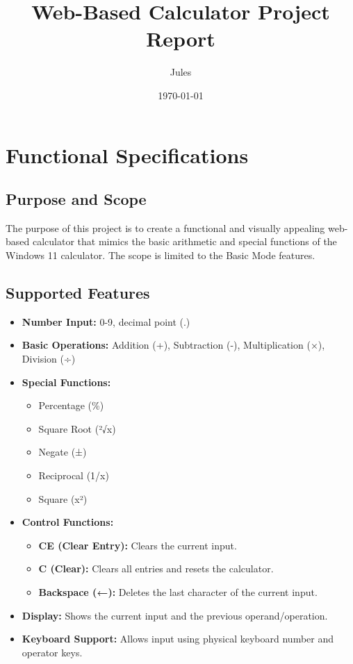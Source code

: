 \documentclass{article}
\title{Web-Based Calculator Project Report}
\author{Jules}
\date{\today}
\begin{document}
\maketitle
\tableofcontents
\newpage

\section{Functional Specifications}

\subsection{Purpose and Scope}
The purpose of this project is to create a functional and visually appealing web-based calculator that mimics the basic arithmetic and special functions of the Windows 11 calculator. The scope is limited to the Basic Mode features.

\subsection{Supported Features}
\begin{itemize}
    \item \textbf{Number Input:} 0-9, decimal point (.)
    \item \textbf{Basic Operations:} Addition (+), Subtraction (-), Multiplication (×), Division (÷)
    \item \textbf{Special Functions:}
    \begin{itemize}
        \item Percentage (\%)
        \item Square Root (²√x)
        \item Negate (±)
        \item Reciprocal (1/x)
        \item Square (x²)
    \end{itemize}
    \item \textbf{Control Functions:}
    \begin{itemize}
        \item \textbf{CE (Clear Entry):} Clears the current input.
        \item \textbf{C (Clear):} Clears all entries and resets the calculator.
        \item \textbf{Backspace (←):} Deletes the last character of the current input.
    \end{itemize}
    \item \textbf{Display:} Shows the current input and the previous operand/operation.
    \item \textbf{Keyboard Support:} Allows input using physical keyboard number and operator keys.
\end{itemize}
\end{document}
